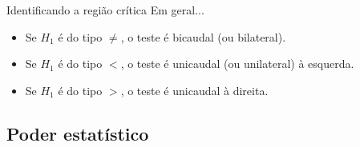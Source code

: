\documentclass{beamer}
\begin{document}

\begin{frame}{\scriptsize Identificando a região crítica}
  \footnotesize
  Em geral...
  \bigskip
  \bigskip
  \bigskip
  \begin{itemize}
  \item Se $H_1$ é do tipo $\ne$, o teste é bicaudal (ou bilateral).
    \medskip
  \item Se $H_1$ é do tipo $<$, o teste é unicaudal (ou unilateral) à esquerda.
    \medskip
  \item Se $H_1$ é do tipo $>$, o teste é unicaudal à direita.
  \end{itemize}
\end{frame}

\subsection[Poder]{Poder estatístico}
\end{document}
